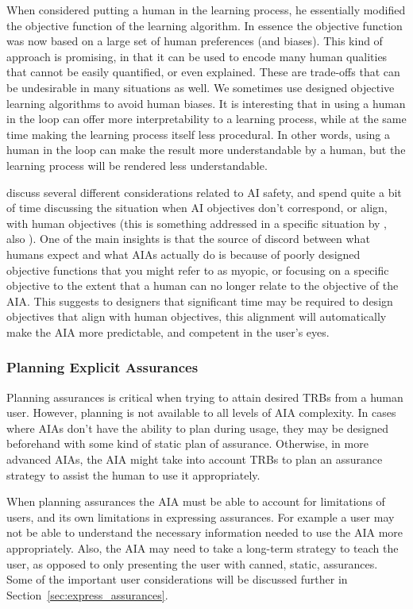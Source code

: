     When \citet{Freitas2006-qo} considered putting a human in the learning process, he essentially modified the objective function of the learning algorithm. In essence the objective function was now based on a large set of human preferences (and biases). This kind of approach is promising, in that it can be used to encode many human qualities that cannot be easily quantified, or even explained. These are trade-offs that can be undesirable in many situations as well. We sometimes use designed objective learning algorithms to avoid human biases. It is interesting that in using a human in the loop can offer more interpretability to a learning process, while at the same time making the learning process itself less procedural. In other words, using a human in the loop can make the result more understandable by a human, but the learning process will be rendered less understandable.

    \citet{Amodei2016-xi} discuss several different considerations related to AI safety, and spend quite a bit of time discussing the situation when AI objectives don't correspond, or align, with human objectives (this is something addressed in a specific situation by \cite{Hadfield-Menell2016-ws}, also \cite{Bostrom2012-uf}). One of the main insights is that the source of discord between what humans expect and what AIAs actually do is because of poorly designed objective functions that you might refer to as myopic, or focusing on a specific objective to the extent that a human can no longer relate to the objective of the AIA. This suggests to designers that significant time may be required to design objectives that align with human objectives, this alignment will automatically make the AIA more predictable, and competent in the user's eyes.

    \subsubsection{Planning Explicit Assurances}
    Planning assurances is critical when trying to attain desired TRBs from a human user. However, planning is not available to all levels of AIA complexity. In cases where AIAs don't have the ability to plan during usage, they may be designed beforehand with some kind of static plan of assurance. Otherwise, in more advanced AIAs, the AIA might take into account TRBs to plan an assurance strategy to assist the human to use it appropriately.

    When planning assurances the AIA must be able to account for limitations of users, and its own limitations in expressing assurances. For example a user may not be able to understand the necessary information needed to use the AIA more appropriately. Also, the AIA may need to take a long-term strategy to teach the user, as opposed to only presenting the user with canned, static, assurances. Some of the important user considerations will be discussed further in Section~\ref{sec:express_assurances}.
    
